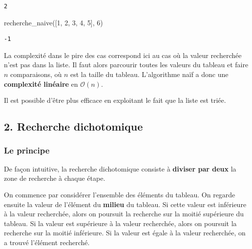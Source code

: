 \documentclass[
  a4paper,
  DIV=11,
  numbers=noendperiod]{scrartcl}
\newenvironment{Shaded}{\begin{snugshade}}{\end{snugshade}}
\newcommand{\DecValTok}[1]{\textcolor[rgb]{0.68,0.00,0.00}{#1}}
\newcommand{\NormalTok}[1]{\textcolor[rgb]{0.00,0.23,0.31}{#1}}
\begin{document}
\begin{verbatim}
2
\end{verbatim}

\begin{Shaded}
\begin{Highlighting}[]
\NormalTok{recherche\_naive([}\DecValTok{1}\NormalTok{, }\DecValTok{2}\NormalTok{, }\DecValTok{3}\NormalTok{, }\DecValTok{4}\NormalTok{, }\DecValTok{5}\NormalTok{], }\DecValTok{6}\NormalTok{)}
\end{Highlighting}
\end{Shaded}

\begin{verbatim}
-1
\end{verbatim}

La complexité dans le pire des cas correspond ici au cas où la valeur
recherchée n'est pas dans la liste. Il faut alors parcourir toutes les
valeurs du tableau et faire \(n\) comparaisons, où \(n\) est la taille
du tableau. L'algorithme naïf a donc une \textbf{complexité linéaire} en
\(\mathcal{O}(n)\).

Il est possible d'être plus efficace en exploitant le fait que la liste
est triée.

\hypertarget{recherche-dichotomique}{%
\subsection{2. Recherche dichotomique}\label{recherche-dichotomique}}

\hypertarget{le-principe}{%
\subsubsection{Le principe}\label{le-principe}}

De façon intuitive, la recherche dichotomique consiste à \textbf{diviser
par deux} la zone de recherche à chaque étape.

On commence par considérer l'ensemble des éléments du tableau. On
regarde ensuite la valeur de l'élément du \textbf{milieu} du tableau. Si
cette valeur est inférieure à la valeur recherchée, alors on poursuit la
recherche sur la moitié supérieure du tableau. Si la valeur est
supérieure à la valeur recherchée, alors on poursuit la recherche sur la
moitié inférieure. Si la valeur est égale à la valeur recherchée, on a
trouvé l'élément recherché.
\end{document}
